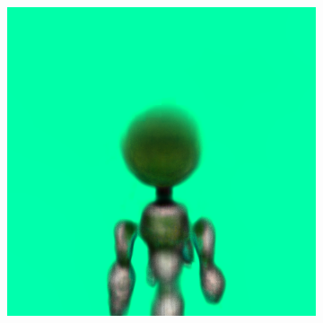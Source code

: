 \begin{figure}[ht]
\begin{subfigure}[b]{0.20\textwidth}
        \includegraphics[width=\textwidth]{figures/appendix/dreamfusion_plantrobot_10000_part1.png}
        \caption{}
    \end{subfigure}
    \hspace{.5cm}
    \begin{subfigure}[b]{0.252\textwidth}
        \centering

\end{subfigure}
\end{figure}
